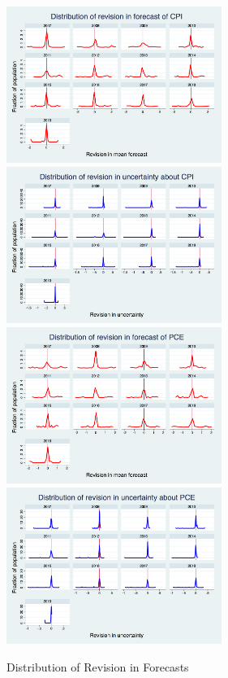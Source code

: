 \documentclass[]{article}
\begin{document}
\begin{figure}[ht]
	\centering
	\includegraphics[width=7cm]{figures/PRCCPIMean01_rv_true_hist.png} 
	\includegraphics[width=7cm]{figures/PRCCPIVar01_rv_true_hist.png}  \\
	\smallskip
	\includegraphics[width=7cm]{figures/PRCPCEMean01_rv_true_hist.png} 
	\includegraphics[width=7cm]{figures/PRCPCEVar01_rv_true_hist.png}  \\
	\caption{Distribution of Revision in Forecasts}
	\label{RevisionHist}
\end{figure}
\end{document}
